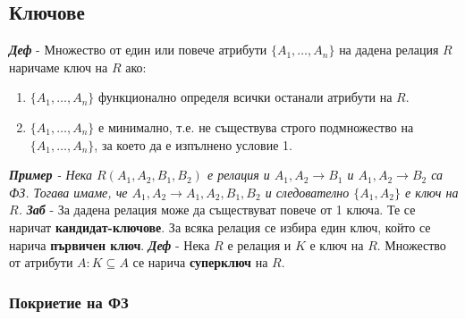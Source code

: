 \documentclass[fleqn,12pt]{article}
\begin{document}
\subsection{Ключове}

\textbf{\textit{Деф}} - Множество от един или повече атрибути $\{A_1, \dots, A_n\}$ на дадена релация $R$ наричаме ключ на $R$ ако:
\begin{enumerate}
    \item $\{A_1, \dots, A_n\}$ функционално определя всички останали атрибути на $R$.
    \item $\{A_1, \dots, A_n\}$ е минимално, т.е. не съществува строго подмножество на $\{A_1, \dots, A_n\}$, за което да е изпълнено условие 1.
\end{enumerate}
\bigbreak
\textit{\textbf{Пример} - Нека $R(A_1, A_2, B_1, B_2)$ е релация и $A_1, A_2 \rightarrow B_1$ и $A_1, A_2 \rightarrow B_2$ са ФЗ.
Тогава имаме, че $A_1, A_2 \rightarrow A_1, A_2, B_1, B_2$ и следователно $\{A_1, A_2\}$ е ключ на $R$.}
\bigbreak
\textbf{\textit{Заб}} - За дадена релация може да съществуват повече от 1 ключа.
Те се наричат \textbf{кандидат-ключове}.
За всяка релация се избира един ключ, който се нарича \textbf{първичен ключ}.
\bigbreak
\textbf{\textit{Деф}} - Нека $R$ е релация и $K$ е ключ на $R$. Множество от атрибути $A: K \subseteq A$ се нарича \textbf{суперключ} на $R$.

\subsubsection{Покриетие на ФЗ}
\end{document}

